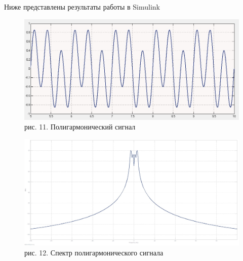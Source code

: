 \documentclass[10pt,a4paper]{report}
\begin{document}
Ниже представлены результаты работы в Simulink
\begin{figure}
\begin{center}
\includegraphics[width=150mm, scale = 0.9]{5_7.jpg}\newline
рис. 11. Полигармонический сигнал\newline
\end{center}
\end{figure}
\begin{figure}
\begin{center}
\includegraphics[width=150mm, scale = 0.9]{5_8.jpg}\newline
рис. 12. Спектр полигармонического сигнала\newline
\end{center}
\end{figure}
\end{document}
